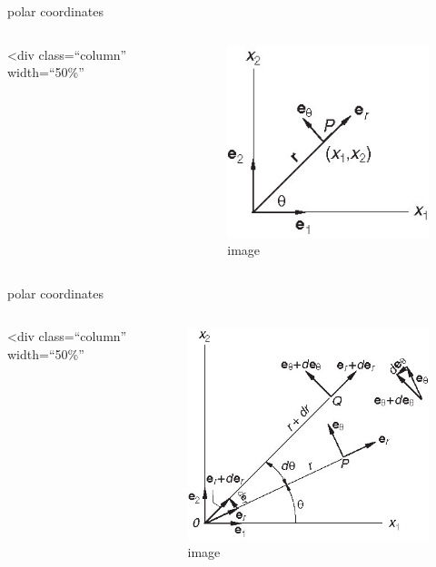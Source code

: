 \begin{frame}{polar coordinates}
\protect\hypertarget{polar-coordinates}{}
\begin{columns}[T]
\textless div class=``column'' width=``50\%''

\begin{figure}
\centering
\includegraphics{../images/f02-33-01-H8560.jpg}
\caption{image}
\end{figure}
\end{columns}
\end{frame}

\begin{frame}{polar coordinates}
\protect\hypertarget{polar-coordinates-1}{}
\begin{columns}[T]
\textless div class=``column'' width=``50\%''

\begin{figure}
\centering
\includegraphics{../images/f02-33-02-H8560.jpg}
\caption{image}
\end{figure}
\end{columns}
\end{frame}

